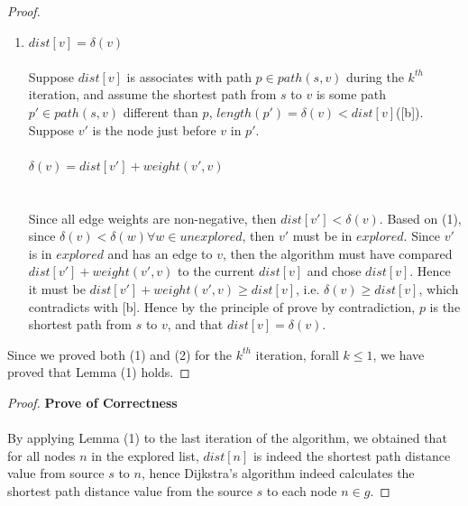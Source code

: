 \documentclass[11pt, oneside]{article}   	%
\newcommand\ftab[1][5cm]{\hspace*{#1}}
\theoremstyle{definition}
\begin{document}
\begin{proof}
\begin{enumerate}
(Proof below are not modified yet)
\item $dist[v] = \delta(v)$
\\\\
Suppose $dist[v]$ is associates with path $p \in path(s, v)$ during the $k^{th}$ iteration, and assume the shortest path from $s$ to $v$ is some path $p' \in path(s, v)$ different than $p$, $length(p') = \delta(v) < dist[v]$([b]). Suppose $v'$ is the node just before $v$ in $p'$. 
\\\\
\ftab $\delta(v) = dist[v'] + weight(v', v)$ \\
\\\\
Since all edge weights are non-negative, then $dist[v'] < \delta(v)$. Based on (1), since $\delta(v) < \delta(w) \forall w \in unexplored$, then $v'$ must be in $explored$. Since $v'$ is in $explored$ and has an edge to $v$, then the algorithm must have compared $dist[v'] + weight(v', v)$ to the current $dist[v]$ and chose $dist[v]$. Hence it must be $dist[v'] + weight(v', v) \geq dist[v]$, i.e. $\delta(v) \geq dist[v]$, which contradicts with [b]. Hence by the principle of prove by contradiction, $p$ is the shortest path from $s$ to $v$, and that $dist[v] = \delta(v)$. 
\end{enumerate}
Since we proved both (1) and (2) for the $k^{th}$ iteration, forall $k \leq 1$, we have proved that Lemma (1) holds.
\end{proof}

\begin{proof}\textbf{Prove of Correctness}
\\\\
By applying Lemma (1) to the last iteration of the algorithm, we obtained that for all nodes $n$ in the explored list, $dist[n]$ is indeed the shortest path distance value from source $s$ to $n$, hence Dijkstra's algorithm indeed calculates the shortest path distance value from the source $s$ to each node $n \in g$. 
\end{proof}
\end{document}
